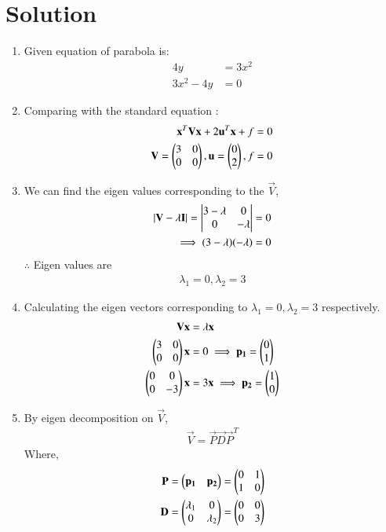 \documentclass[journal,12pt,twocolumn]{IEEEtran}
\begin{document}
\section{Solution}
\begin{enumerate}
\item Given equation of parabola is:
\begin{align}
 4y&=3x^2
 \\
 3x^2-4y&=0
\end{align}
\item Comparing with the standard equation :
\begin{align}
\mathbf{x}^T\mathbf{V}\mathbf{x}+2\mathbf{u}^T\mathbf{x}+f=0
\\
\mathbf{V}=\begin{pmatrix}3&0\\0&0\end{pmatrix},\mathbf{u}=\begin{pmatrix}0\\2\end{pmatrix},f=0 \label{eqA}
\end{align}
\item We can find the eigen values corresponding to the $\vec{V}$,
\begin{align}
\lvert\mathbf{V} - \lambda\mathbf{I}\vert = \begin{vmatrix}3-\lambda & 0 \\ 0 & -\lambda\end{vmatrix} &= 0
\\
\implies (3- \lambda)(-\lambda) &= 0
\end{align}
$\therefore$ Eigen values are 
\begin{align}
\lambda_1 = 0 , \lambda_2 = 3
\end{align}
\item Calculating the eigen vectors corresponding to $\lambda_1 = 0 , \lambda_2 = 3$ respectively.
\begin{align}
\mathbf{V}\mathbf{x} &= \lambda\mathbf{x}
\\
\begin{pmatrix}3 & 0 \\ 0 & 0\end{pmatrix}\mathbf{x} &=0 \implies \mathbf{p_1} = \begin{pmatrix}0 \\ 1\end{pmatrix}
\\
\begin{pmatrix}0 & 0 \\ 0 & -3\end{pmatrix}\mathbf{x} &=3\mathbf{x}  \implies \mathbf{p_2} = \begin{pmatrix}1 \\ 0\end{pmatrix}
\end{align}
\item By eigen decomposition on $\vec{V}$,
\begin{align}
\vec{V}=\vec{P}\vec{D}\vec{P}^T
\end{align}
Where,
\begin{align}
\vec{P} &= \myvec{\vec{p_1} & \vec{p_2}} = \myvec{0 & 1 \\ 1 & 0}
\\
\vec{D} &= \myvec{\lambda_1 & 0 \\ 0 & \lambda_2} =\myvec{0 & 0 \\ 0 & 3} 

\end{align}
\end{enumerate}
\end{document}
